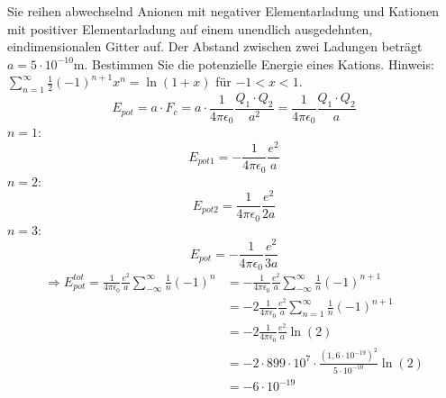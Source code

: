\documentclass[12pt]{article}
\newcommand{\kq}{\frac{1}{4 \pi \epsilon_0}}
\renewcommand{\Phi}{\phi}
\newenvironment{exercise}[2][Aufgabe]{\begin{trivlist}
\item[\hskip \labelsep {\bfseries #1}\hskip \labelsep {\bfseries #2.}]}{\end{trivlist}}
\begin{document}
\begin{exercise}{5}
Sie reihen abwechselnd Anionen mit negativer Elementarladung und Kationen mit positiver Elementarladung auf einem unendlich ausgedehnten, eindimensionalen Gitter auf. Der Abstand zwischen zwei Ladungen beträgt $a = 5 \cdot 10^{-10}$m. Bestimmen Sie die potenzielle Energie eines
Kations. Hinweis: $\sum_{n=1}^\infty \frac{1}{2} (−1)^{n+1}x^n = \ln(1 + x)$ für $−1 < x < 1$.\\[10pt]

$$E_{pot} = a \cdot F_c = a \cdot \kq \frac{Q_1 \cdot Q_2}{a^2} = \kq \frac{Q_1 \cdot Q_2}{a}$$
$n = 1$: $$ E_{pot1} = - \kq \frac{e^2}{a}$$
$n = 2$: $$ E_{pot2} = \kq \frac{e^2}{2a}$$
$n = 3$: $$ E_{pot} = - \kq \frac{e^2}{3a}$$
\begin{align*}
	\Rightarrow E^{tot}_{pot} = \kq \frac{e^2}{a}\sum_{-\infty}^{\infty}\frac{1}{n}(-1)^n &= -\kq \frac{e^2}{a}\sum_{-\infty}^{\infty}\frac{1}{n}(-1)^{n+1}\\
	&= -2 \kq \frac{e^2}{a}\sum_{n=1}^{\infty}\frac{1}{n}(-1)^{n+1}\\
	&= -2 \kq \frac{e^2}{a}\ln(2)\\
	&= -2 \cdot 899\cdot 10^7 \cdot \frac{(1,6 \cdot 10^{-19})^2}{5 \cdot 10^{-10}}\ln(2)\\
	&= -6 \cdot 10^{-19}
\end{align*}

\end{exercise}
 
\end{document}
